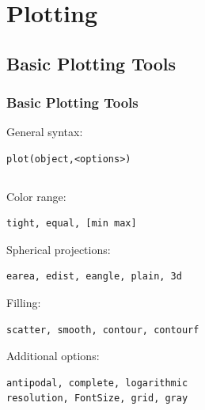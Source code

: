 
\section{Plotting}


\subsection*{Basic Plotting Tools}

\begin{frame}[fragile]
  \frametitle{Basic \MTEX Plotting Tools}

General syntax:
\begin{lstlisting}
plot(object,<options>)
\end{lstlisting}

\begin{columns}
  \begin{column}{8.5cm}





    Color range:

\begin{lstlisting}
tight, equal, [min max]
\end{lstlisting}

    Spherical projections:
\begin{lstlisting}
earea, edist, eangle, plain, 3d
\end{lstlisting}

    Filling:
\begin{lstlisting}
scatter, smooth, contour, contourf
\end{lstlisting}

    Additional options:
\begin{lstlisting}
antipodal, complete, logarithmic
resolution, FontSize, grid, gray
\end{lstlisting}


  \end{column}


\end{columns}
\end{frame}
